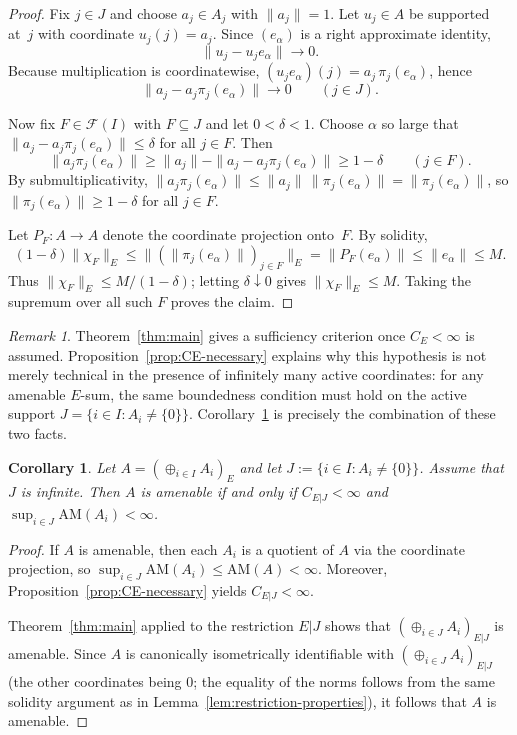\documentclass[reqno]{amsart}
\theoremstyle{plain}
\newtheorem{corollary}[theorem]{Corollary}
\theoremstyle{definition}
\theoremstyle{remark}
\newtheorem{remark}[theorem]{Remark}
\newcommand{\AM}{\mathrm{AM}}
\newcommand{\cF}{\mathcal{F}}
\renewcommand{\le}{\leqslant}
\renewcommand{\ge}{\geqslant}
\begin{document}
\begin{proof}
Fix $j\in J$ and choose $a_j\in A_j$ with $\|a_j\|=1$.
Let $u_j\in A$ be supported at~$j$ with coordinate $u_j(j)=a_j$.
Since $(e_\alpha)$ is a right approximate identity,
\[
\|u_j-u_je_\alpha\|\longrightarrow 0.
\]
Because multiplication is coordinatewise, $(u_je_\alpha)(j)=a_j\,\pi_j(e_\alpha)$, hence
\[
\|a_j-a_j\pi_j(e_\alpha)\|\longrightarrow 0 \qquad (j\in J).
\]

Now fix $F\in\cF(I)$ with $F\subseteq J$ and let $0<\delta<1$.
Choose $\alpha$ so large that $\|a_j-a_j\pi_j(e_\alpha)\|\le \delta$ for all $j\in F$.
Then
\[
\|a_j\pi_j(e_\alpha)\|\ge \|a_j\|-\|a_j-a_j\pi_j(e_\alpha)\|\ge 1-\delta
\qquad (j\in F).
\]
By submultiplicativity, $\|a_j\pi_j(e_\alpha)\|\le \|a_j\|\,\|\pi_j(e_\alpha)\|=\|\pi_j(e_\alpha)\|$,
so $\|\pi_j(e_\alpha)\|\ge 1-\delta$ for all $j\in F$.

Let $P_F\colon A\to A$ denote the coordinate projection onto~$F$.  By solidity,
\[
(1-\delta)\|\chi_F\|_E
\le \bigl\|(\|\pi_j(e_\alpha)\|)_{j\in F}\bigr\|_E
=\|P_F(e_\alpha)\|
\le \|e_\alpha\|\le M.
\]
Thus $\|\chi_F\|_E\le M/(1-\delta)$; letting $\delta\downarrow0$ gives
$\|\chi_F\|_E\le M$.  Taking the supremum over all such $F$ proves the claim.
\end{proof}

\begin{remark}\label{rem:main-necessity-bridge}
Theorem~\ref{thm:main} gives a sufficiency criterion once $C_E<\infty$ is assumed.
Proposition~\ref{prop:CE-necessary} explains why this hypothesis is not merely technical in
the presence of infinitely many active coordinates: for any amenable $E$-sum, the same
boundedness condition must hold on the active support $J=\{i\in I:A_i\neq\{0\}\}$.
Corollary~\ref{cor:iff} is precisely the combination of these two facts.
\end{remark}


\begin{corollary}\label{cor:iff}
Let $A=(\oplus_{i\in I}A_i)_E$ and let $J:=\{i\in I: A_i\neq\{0\}\}$.
Assume that $J$ is infinite. Then $A$ is amenable if and only if
$C_{E|J}<\infty$ and $\sup_{i\in J}\AM(A_i)<\infty$.
\end{corollary}

\begin{proof}
If $A$ is amenable, then each $A_i$ is a quotient of $A$ via the coordinate projection,
so $\sup_{i\in J}\AM(A_i)\le \AM(A)<\infty$. Moreover, Proposition~\ref{prop:CE-necessary}
yields $C_{E|J}<\infty$.

Theorem~\ref{thm:main} applied to the restriction $E|J$ shows that $(\oplus_{i\in J}A_i)_{E|J}$ is amenable. Since $A$ is canonically isometrically identifiable with $(\oplus_{i\in J}A_i)_{E|J}$ (the other coordinates being $0$; the equality of the norms follows from the same solidity argument as in Lemma~\ref{lem:restriction-properties}), it follows that $A$ is amenable.
\end{proof}
\end{document}
